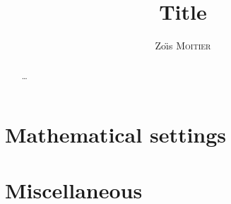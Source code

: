 \documentclass[12pt,a4paper,reqno]{amsart}
\title{Title}
\author{Zo{\"\i}s \textsc{Moitier}}
\date{\Rd{\textbf{\today}}}
\numberwithin{equation}{section}
\theoremstyle{definition}
\theoremstyle{plain}
\theoremstyle{remark}
\begin{document}
\begin{abstract}
    \ldots
\end{abstract}

\maketitle

\setcounter{tocdepth}{2}
\tableofcontents


\section{Mathematical settings}


\appendix

\section{Miscellaneous}


%
%
\end{document}
